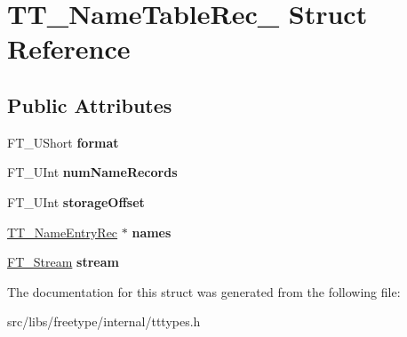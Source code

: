 \hypertarget{struct_t_t___name_table_rec__}{
\section{TT\_\-NameTableRec\_\- Struct Reference}
\label{struct_t_t___name_table_rec__}
}
\subsection*{Public Attributes}
\begin{DoxyCompactItemize}
\item 
\hypertarget{struct_t_t___name_table_rec___a762c5431cbe285cb7153bb5650710fb0}{
FT\_\-UShort {\bfseries format}}
\label{struct_t_t___name_table_rec___a762c5431cbe285cb7153bb5650710fb0}

\item 
\hypertarget{struct_t_t___name_table_rec___a5b565d940b9d02bb69cd19da5cda61b8}{
FT\_\-UInt {\bfseries numNameRecords}}
\label{struct_t_t___name_table_rec___a5b565d940b9d02bb69cd19da5cda61b8}

\item 
\hypertarget{struct_t_t___name_table_rec___a4ed1f4e78e39b2e206411e9ea4d23801}{
FT\_\-UInt {\bfseries storageOffset}}
\label{struct_t_t___name_table_rec___a4ed1f4e78e39b2e206411e9ea4d23801}

\item 
\hypertarget{struct_t_t___name_table_rec___a693aed17954386eb8fb5fd7f69d5b551}{
\hyperlink{struct_t_t___name_entry_rec__}{TT\_\-NameEntryRec} $\ast$ {\bfseries names}}
\label{struct_t_t___name_table_rec___a693aed17954386eb8fb5fd7f69d5b551}

\item 
\hypertarget{struct_t_t___name_table_rec___a97109aec8cd7ca13f6627f3fee15d48d}{
\hyperlink{struct_f_t___stream_rec__}{FT\_\-Stream} {\bfseries stream}}
\label{struct_t_t___name_table_rec___a97109aec8cd7ca13f6627f3fee15d48d}

\end{DoxyCompactItemize}


The documentation for this struct was generated from the following file:\begin{DoxyCompactItemize}
\item 
src/libs/freetype/internal/tttypes.h\end{DoxyCompactItemize}
